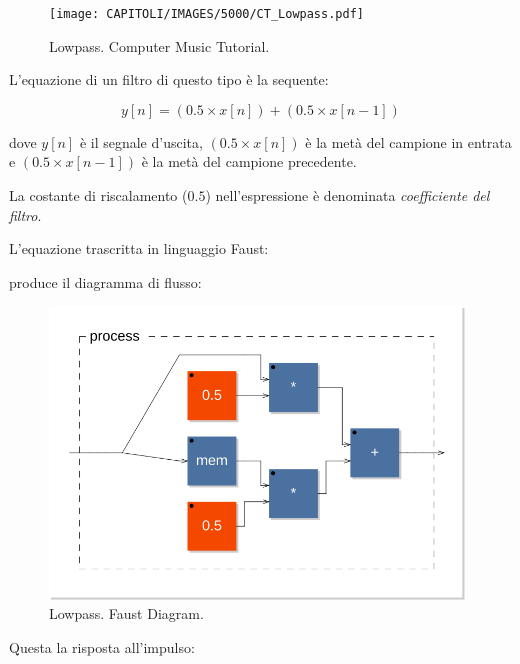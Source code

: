 \begin{figure}[ht]
  \centering
  \texttt{[image: CAPITOLI/IMAGES/5000/CT\_Lowpass.pdf]}
  \caption{Lowpass. Computer Music Tutorial.}
  \label{CT-Lowpass}
\end{figure}

L'equazione di un filtro di questo tipo è la sequente:

\begin{equation}
  \label{lowpass}
  y[n] = (0.5 \times x[n]) + (0.5 \times x[n-1])
\end{equation}

dove $y[n]$ è il segnale d'uscita, $(0.5 \times x[n])$ è la metà del campione in
entrata e $(0.5 \times x[n-1])$ è la metà del campione precedente.

La costante di riscalamento ($0.5$) nell'espressione è denominata \emph{coefficiente
del filtro}.

L'equazione trascritta in linguaggio Faust:



produce il diagramma di flusso:

\begin{figure}[ht]
  \centering
  \includegraphics[width=0.98\textwidth]{CAPITOLI/CODES/5000/lowpass-svg/process}
  \caption{Lowpass. Faust Diagram.}
  \label{fdlowpass}
\end{figure}

Questa la risposta all'impulso:


